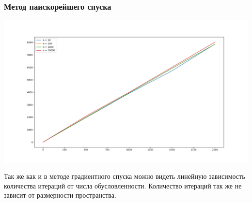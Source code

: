 \documentclass[english]{article}
\begin{document}
\subsubsection{Метод наискорейшего спуска}

\begin{center}
    \includegraphics[scale=0.4]{plots/steepest_gradient_1.png}
\end{center} 
Так же как и в методе градиентного
спуска можно видеть линейную зависимость количества итераций от числа
обусловленности. Количество итераций так же не зависит от размерности
пространства.
\end{document}
